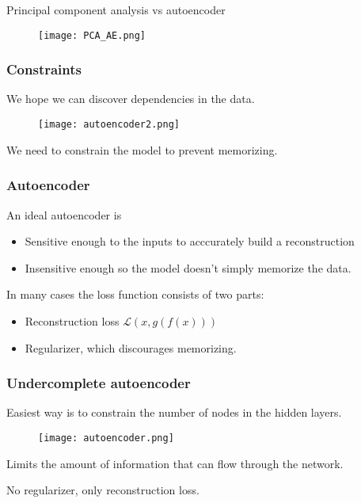 \documentclass[t]{beamer}
\begin{document}
\begin{frame}
  Principal component analysis vs autoencoder
  
  \begin{figure}
    \texttt{[image: PCA\_AE.png]}
  \end{figure}
\end{frame}


\begin{frame}
  \frametitle{Constraints}

  We hope we can discover dependencies in the data. 
  
  \begin{figure}
    \texttt{[image: autoencoder2.png]}
  \end{figure}

  We need to constrain the model to prevent memorizing.
\end{frame}

\begin{frame}
  \frametitle{Autoencoder}

  An ideal autoencoder is

  \vspace{5pt}

  \begin{itemize}
  \item Sensitive enough to the inputs to acccurately build
    a reconstruction
  \item Insensitive enough so the model doesn't simply
    memorize the data. 
  \end{itemize}

  \vspace{15pt}

  In many cases the loss function consists of two parts:

  \vspace{5pt}

  \begin{itemize}
  \item Reconstruction loss $\mathcal{L}(x, g(f(x)))$
  \item Regularizer, which discourages memorizing. 
  \end{itemize}
\end{frame}


\begin{frame}
  \frametitle{Undercomplete autoencoder}

  Easiest way is to constrain the number of nodes in the
  hidden layers. 

  \begin{figure}
    \texttt{[image: autoencoder.png]}
  \end{figure}

  Limits the amount of information that can flow through the
  network.

  \vspace{2mm}
  
  No regularizer, only reconstruction loss. 
  
\end{frame}
\end{document}
